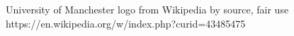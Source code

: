 \begin{thebibliography}{11}

  University of Manchester logo from Wikipedia by source, fair use\newline
  https://en.wikipedia.org/w/index.php?curid=43485475

\end{thebibliography}
